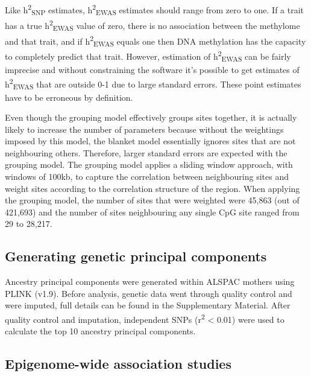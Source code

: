 \documentclass[11pt,oneside]{bristolthesis}
\begin{document}
Like h\textsuperscript{2}\textsubscript{SNP} estimates, h\textsuperscript{2}\textsubscript{EWAS} estimates should range from zero to one. If a trait has a true h\textsuperscript{2}\textsubscript{EWAS} value of zero, there is no association between the methylome and that trait, and if h\textsuperscript{2}\textsubscript{EWAS} equals one then DNA methylation has the capacity to completely predict that trait. However, estimation of h\textsuperscript{2}\textsubscript{EWAS} can be fairly imprecise and without constraining the software it's possible to get estimates of h\textsuperscript{2}\textsubscript{EWAS} that are outside 0-1 due to large standard errors. These point estimates have to be erroneous by definition.

Even though the grouping model effectively groups sites together, it is actually likely to increase the number of parameters because without the weightings imposed by this model, the blanket model essentially ignores sites that are not neighbouring others. Therefore, larger standard errors are expected with the grouping model. The grouping model applies a sliding window approach, with windows of 100kb, to capture the correlation between neighbouring sites and weight sites according to the correlation structure of the region. When applying the grouping model, the number of sites that were weighted were 45,863 (out of 421,693) and the number of sites neighbouring any single CpG site ranged from 29 to 28,217.

\hypertarget{generating-genetic-principal-components}{%
\subsection{Generating genetic principal components}\label{generating-genetic-principal-components}}

Ancestry principal components were generated within ALSPAC mothers using PLINK (v1.9). Before analysis, genetic data went through quality control and were imputed, full details can be found in the Supplementary Material. After quality control and imputation, independent SNPs (r\textsuperscript{2} \textless{} 0.01) were used to calculate the top 10 ancestry principal components.

\hypertarget{methods-ewas-05}{%
\subsection{Epigenome-wide association studies}\label{methods-ewas-05}}
\end{document}
